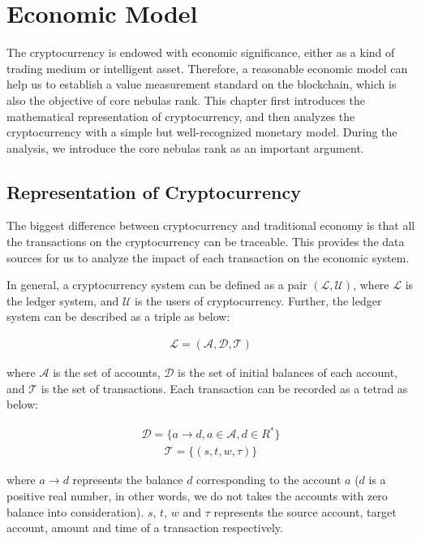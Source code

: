 \section{Economic Model}
The cryptocurrency is endowed with economic significance, either as a kind of trading medium or intelligent asset. Therefore, a reasonable economic model can help us to establish a value measurement standard on the blockchain, which is also the objective of core nebulas rank. This chapter first introduces the mathematical representation of cryptocurrency, and then analyzes the cryptocurrency with a simple but well-recognized monetary model. During the analysis, we introduce the core nebulas rank as an important argument.

\subsection{Representation of Cryptocurrency}
The biggest difference between cryptocurrency and traditional economy is that all the transactions on the cryptocurrency can be traceable. This provides the data sources for us to analyze the impact of each transaction on the economic system.

In general, a cryptocurrency system can be defined as a pair $(\mathcal{L}, \mathcal{U})$, where $\mathcal{L}$ is the ledger system, and $\mathcal{U}$ is the users of cryptocurrency. Further, the ledger system can be described as a triple as below:

\begin{align}
\mathcal{L} = (\mathcal{A}, \mathcal{D}, \mathcal{T})
\end{align}

\noindent where $\mathcal{A}$ is the set of accounts, $\mathcal{D}$ is the set of initial balances of each account, and $\mathcal{T}$ is the set of transactions. Each transaction can be recorded as a tetrad as below:

\begin{align}
\mathcal{D} = \{a \rightarrow d, a{\in}\mathcal{A}, d{\in}R^*\}
\end{align}
\begin{align}
\mathcal{T} = \{(s, t, w, \tau)\}
\end{align}

\noindent where $a \rightarrow d$ represents the balance $d$ corresponding to the account $a$ ($d$ is a positive real number, in other words, we do not takes the accounts with zero balance into consideration). $s$, $t$, $w$ and $\tau$ represents the source account, target account, amount and time of a transaction respectively.

